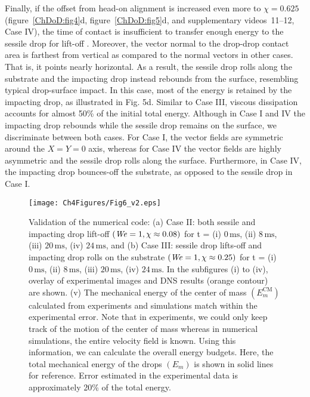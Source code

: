 Finally, if the offset from head-on alignment is increased even more to $\chi = 0.625$ (figure~\ref{ChDoD:fig4}d, figure~\ref{ChDoD:fig5}d, and supplementary videos~{\color{Myfig}11--12}, Case IV), the time of contact is insufficient to transfer enough energy to the sessile drop for lift-off \cite{andrew2017}. Moreover, the vector normal to the drop-drop contact area is farthest from vertical as compared to the normal vectors in other cases. That is, it points nearly horizontal. As a result, the sessile drop rolls along the substrate and the impacting drop instead rebounds from the surface, resembling typical drop-surface impact. In this case, most of the energy is retained by the impacting drop, as illustrated in Fig. 5d. Similar to Case III, viscous dissipation accounts for almost 50\% of the initial total energy. Although in Case I and IV the impacting drop rebounds while the sessile drop remains on the surface, we discriminate between both cases. For Case I, the vector fields are symmetric around the $X = Y = 0$ axis, whereas for Case IV the vector fields are highly asymmetric and the sessile drop rolls along the surface. Furthermore, in Case IV, the impacting drop bounces-off the substrate, as opposed to the sessile drop in Case I. 

\begin{figure}
	\centering
	\texttt{[image: Ch4Figures/Fig6\_v2.eps]}
	\caption{Validation of the numerical code: (a) Case II: both sessile and impacting drop lift-off $\left(\mathit{We} = 1, \chi \approx 0.08\right)$ for t = (i) $0\,\si{\milli\second}$, (ii) $8\,\si{\milli\second}$, (iii) $20\,\si{\milli\second}$, (iv) $24\,\si{\milli\second}$, and (b) Case III: sessile drop lifts-off and impacting drop rolls on the substrate $\left(\mathit{We} = 1, \chi \approx 0.25\right)$ for t = (i) $0\,\si{\milli\second}$, (ii) $8\,\si{\milli\second}$, (iii) $20\,\si{\milli\second}$, (iv) $24\,\si{\milli\second}$. In the subfigures (i) to (iv), overlay of experimental images and DNS results (orange contour) are shown. (v) The mechanical energy of the center of mass $\left(E_m^{\text{CM}}\right)$ calculated from experiments and simulations match within the experimental error. Note that in experiments, we could only keep track of the motion of the center of mass whereas in numerical simulations, the entire velocity field is known. Using this information, we can calculate the overall energy budgets. Here, the total mechanical energy of the drops $\left(E_m\right)$ is shown in solid lines for reference. Error estimated in the experimental data is approximately 20\% of the total energy.}
	\label{ChDoD:fig6}
\end{figure}

